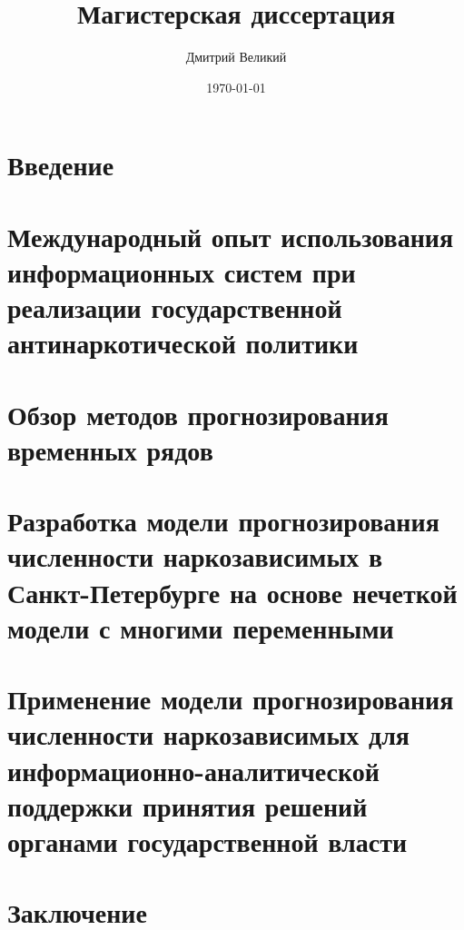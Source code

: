 \documentclass[a4paper,14pt]{report}
\author{Дмитрий Великий}
\title{Магистерская диссертация}
\date{\today}
\begin{document}
\tableofcontents
\chapter*{Введение}

\chapter{Международный опыт использования информационных систем при реализации
    государственной антинаркотической политики}

\chapter{Обзор методов прогнозирования временных рядов}

\chapter{Разработка модели прогнозирования численности наркозависимых в 
Санкт-Петербурге на основе нечеткой модели с многими переменными}

\chapter{Применение модели прогнозирования численности наркозависимых для
    информационно-аналитической поддержки принятия решений органами
    государственной власти}

\chapter*{Заключение}

\newpage
\printbibliography[heading=bibintoc]
\end{document}
